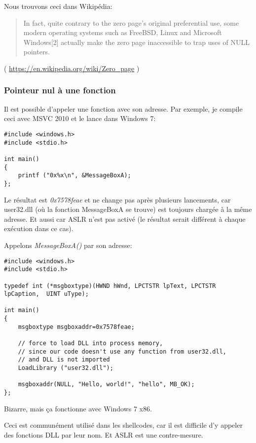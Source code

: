 Nous trouvons ceci dans Wikipédia:

\begin{framed}
\begin{quotation}
In fact, quite contrary to the zero page's original preferential use, some modern operating systems such as FreeBSD, Linux and Microsoft Windows[2] actually make the zero page inaccessible to trap uses of NULL pointers. 
\end{quotation}
\end{framed}
( \url{https://en.wikipedia.org/wiki/Zero_page} )

\subsubsection{Pointeur nul à une fonction}

Il est possible d'appeler une fonction avec son adresse.
Par exemple, je compile ceci avec MSVC 2010 et le lance dans Windows 7:

\begin{lstlisting}[style=customc]
#include <windows.h>
#include <stdio.h>

int main()
{
	printf ("0x%x\n", &MessageBoxA);
};
\end{lstlisting}

Le résultat est \emph{0x7578feae} et ne change pas après plusieurs lancements, car user32.dll
(où la fonction MessageBoxA se trouve) est toujours chargée à la même adresse.
Et aussi car \ac{ASLR} n'est pas activé (le résultat serait différent à chaque exécution
dans ce cas).

Appelons \emph{MessageBoxA()} par son adresse:

\begin{lstlisting}[style=customc]
#include <windows.h>
#include <stdio.h>

typedef int (*msgboxtype)(HWND hWnd, LPCTSTR lpText, LPCTSTR lpCaption,  UINT uType);

int main()
{
	msgboxtype msgboxaddr=0x7578feae;

	// force to load DLL into process memory, 
	// since our code doesn't use any function from user32.dll, 
	// and DLL is not imported
	LoadLibrary ("user32.dll");

	msgboxaddr(NULL, "Hello, world!", "hello", MB_OK);
};
\end{lstlisting}

Bizarre, mais ça fonctionne avec Windows 7 x86.

Ceci est communément utilisé dans les shellcodes, car il est difficile d'y appeler
des fonctions DLL par leur nom.
Et \ac{ASLR} est une contre-mesure.

